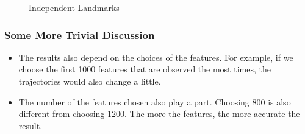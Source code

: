 \documentclass[conference]{IEEEtran}
\begin{document}
\begin{figure}[htbp]
    \centering

    \centering
    \caption{Independent Landmarks} \label{fig:independent}
\end{figure}

\subsubsection{Some More Trivial Discussion}
\begin{itemize}
    \item The results also depend on the choices of the features. For example, if we choose the first 1000 features that
    are observed the most times, the trajectories would also change a little.
    \item The number of the features chosen also play a part. Choosing 800 is also different from choosing 1200. The more
    the features, the more accurate the result.
\end{itemize}
\end{document}

